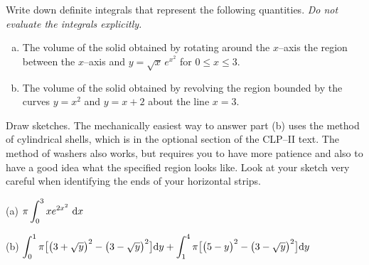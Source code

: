 
\begin{question}[2000D]  %
Write down definite integrals that represent the following quantities.
\emph{Do not evaluate the integrals explicitly.}
\begin{enumerate}[(a)]
\item
The volume of the solid obtained by rotating  around the $x$--axis the
region between the $x$--axis and $y=\sqrt{x}\, e^{x^2}$ for $0\le x\le 3$.
\item
The volume of the solid obtained by revolving the
region bounded by the curves $y=x^2$ and $y=x+2$ about the line $x=3$.
\end{enumerate}
\end{question}

\begin{hint}
Draw sketches.
The mechanically easiest way to answer part (b) uses the method of cylindrical
shells, which is in the optional section 
                of the CLP--II text.  The method of washers also works, but requires  you to have more patience and also
to have a good idea what the specified region looks like.  Look at your sketch
very careful when identifying the ends of your horizontal strips.
\end{hint}

\begin{answer} (a)
$\pi\displaystyle\int_{0}^{3} xe^{2x^2}\ \mathrm{d}x$

\noindent (b)
$\displaystyle\int _0^1  \pi\big[\big(3+\sqrt{y}\big)^2-\big(3-\sqrt{y}\big)^2\big]\mathrm{d}y
+\displaystyle\int _ 1^4  \pi\big[\big(5-y\big)^2-\big(3-\sqrt{y}\big)^2\big]\mathrm{d}y$

\end{answer}

